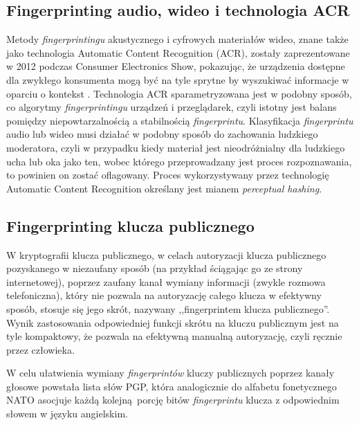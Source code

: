 \subsection{Fingerprinting audio, wideo i technologia ACR}
Metody \emph{fingerprintingu} akustycznego i cyfrowych materiałów wideo, znane
także jako technologia Automatic Content Recognition (ACR), zostały
zaprezentowane w 2012 podczas Consumer Electronics Show, pokazując, że
urządzenia dostępne dla zwykłego konsumenta mogą być na tyle sprytne by
wyszukiwać informacje w oparciu o kontekst \cite{ng2012brief}. Technologia ACR
sparametryzowana jest w podobny sposób, co algorytmy \emph{fingerprintingu}
urządzeń i przeglądarek, czyli istotny jest balans pomiędzy niepowtarzalnością a
stabilnością \emph{fingerprintu}. Klasyfikacja \emph{fingerprintu} audio lub
wideo musi działać w podobny sposób do zachowania ludzkiego moderatora, czyli w
przypadku kiedy materiał jest nieodróżnialny dla ludzkiego ucha lub oka jako
ten, wobec którego przeprowadzany jest proces rozpoznawania, to powinien on
zostać oflagowany. Proces wykorzystywany przez technologię Automatic Content
Recognition określany jest mianem \emph{perceptual hashing}.

\subsection{Fingerprinting klucza publicznego}
W kryptografii klucza publicznego, w celach autoryzacji klucza publicznego
pozyskanego w niezaufany sposób (na przykład ściągając go ze strony
internetowej), poprzez zaufany kanał wymiany informacji (zwykle rozmowa
telefoniczna), który nie pozwala na autoryzację całego klucza w efektywny
sposób, stosuje się jego skrót, nazywany ,,fingerprintem klucza publicznego''.
Wynik zastosowania odpowiedniej funkcji skrótu na kluczu publicznym jest na tyle
kompaktowy, że pozwala na efektywną manualną autoryzację, czyli ręcznie przez
człowieka.

W celu ułatwienia wymiany \emph{fingerprintów} kluczy publicznych poprzez kanały
głosowe powstała lista słów PGP, która analogicznie do alfabetu fonetycznego
NATO asocjuje każdą kolejną porcję bitów \emph{fingerprintu} klucza z
odpowiednim słowem w języku angielskim.
